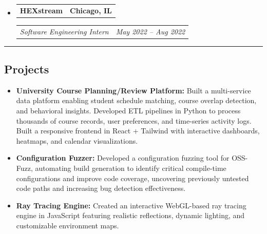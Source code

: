 \documentclass[11pt,letterpaper]{article}
\makeatletter
\newcommand{\headerrow}[2]
{\begin{tabular*}{\linewidth}{l@{\extracolsep{\fill}}r}
#1 &
#2 \\
\end{tabular*}}
\makeatother
\begin{document}
\begin{itemize}[leftmargin=1em]
	\item
	      \headerrow
	      {\textbf{HEXstream}}
	      {\textbf{Chicago, IL}}
	      \headerrow
	      {\emph{Software Engineering Intern}}
	      {\emph{May 2022 -- Aug 2022}}
\end{itemize}
\hrule
\vspace{-1em}
\subsection*{\Large Projects}
\begin{itemize}[leftmargin=1em,noitemsep]
    \item \textbf{University Course Planning/Review Platform:} Built a multi-service data platform enabling student schedule matching, course overlap detection, and behavioral insights. Developed ETL pipelines in Python to process thousands of course records, user preferences, and time-series activity logs. Built a responsive frontend in React + Tailwind with interactive dashboards, heatmaps, and calendar visualizations.
    \item \textbf{Configuration Fuzzer:} Developed a configuration fuzzing tool for OSS-Fuzz, automating build generation to identify critical compile-time configurations and improve code coverage, uncovering previously untested code paths and increasing bug detection effectiveness.
    \item \textbf{Ray Tracing Engine:} Created an interactive WebGL-based ray tracing engine in JavaScript featuring realistic reflections, dynamic lighting, and customizable environment maps.
\end{itemize}
\end{document}
